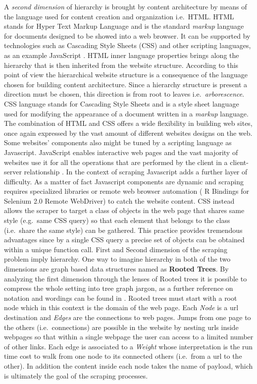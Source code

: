 \documentclass[
  12pt,
  a4paper,
  oneside]{book}
\theoremstyle{definition}
\theoremstyle{definition}
\theoremstyle{definition}
\theoremstyle{remark}
\begin{document}
A \emph{second dimension} of hierarchy is brought by content architecture by means of the language used for content creation and organization i.e.~HTML. HTML stands for Hyper Text Markup Language and is the standard \emph{markup} language for documents designed to be showed into a web browser. It can be supported by technologies such as Cascading Style Sheets (CSS) and other scripting languages, as an example JavaScript \citep{html_2020}.
HTML inner language properties brings along the hierarchy that is then inherited from the website structure. According to this point of view the hierarchical website structure is a consequence of the language chosen for building content architecture.
Since a hierarchy structure is present a direction must be chosen, this direction is from root to leaves i.e.~\emph{arborescence}.
CSS language stands for Cascading Style Sheets and is a style sheet language used for modifying the appearance of a document written in a \emph{markup} language\citep{css_2020}.
The combination of HTML and CSS offers a wide flexibility in building web sites, once again expressed by the vast amount of different websites designs on the web. Some websites' components also might be tuned by a scripting language as Javascript. JavaScript enables interactive web pages and the vast majority of websites use it for all the operations that are performed by the client in a client-server relationship \citep{Javascript_2020}.
In the context of scraping Javascript adds a further layer of difficulty. As a matter of fact Javascript components are dynamic and scraping requires specialized libraries or remote web browser automation (\citep{RSelenium} R Bindings for Selenium 2.0 Remote WebDriver) to catch the website content.
CSS instead allows the scraper to target a class of objects in the web page that shares same style (e.g.~same CSS query) so that each element that belongs to the class (i.e.~share the same style) can be gathered. This practice provides tremendous advantages since by a single CSS query a precise set of objects can be obtained within a unique function call.
First and Second dimension of the scraping problem imply hierarchy. One way to imagine hierarchy in both of the two dimensions are graph based data structures named as \textbf{Rooted Trees}. By analyzing the first dimension through the lenses of Rooted trees it is possible to compress the whole setting into tree graph jargon, as a further reference on notation and wordings can be found in \citet{Graph_Diestel}. Rooted trees must start with a root node which in this context is the domain of the web page. Each \emph{Node} is a url destination and \emph{Edges} are the connections to web pages. Jumps from one page to the others (i.e.~connections) are possible in the website by nesting urls inside webpages so that within a single webpage the user can access to a limited number of other links. Each edge is associated to a \emph{Weight} whose interpretation is the run time cost to walk from one node to its connected others (i.e.~from a url to the other). In addition the content inside each node takes the name of payload, which is ultimately the goal of the scraping processes.
\end{document}
